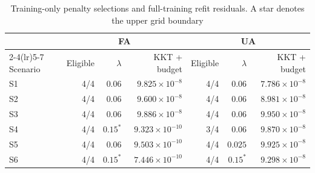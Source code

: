 \begin{table}[htbp]
\centering\small
\caption{Training-only penalty selections and full-training refit residuals. A star denotes the upper grid boundary}
\label{tab:cv-selection}
\setlength{\tabcolsep}{4.5pt}
\begin{tabular}{@{}lrrrrrr@{}}
\toprule
 & \multicolumn{3}{c}{FA} & \multicolumn{3}{c}{UA} \\
\cmidrule(lr){2-4}\cmidrule(lr){5-7}
Scenario & Eligible & $\lambda$ & KKT + budget & Eligible & $\lambda$ & KKT + budget \\
\midrule
S1 & 4/4 & $0.06$ & $9.825\times10^{-8}$ & 4/4 & $0.06$ & $7.786\times10^{-8}$ \\
S2 & 4/4 & $0.06$ & $9.600\times10^{-8}$ & 4/4 & $0.06$ & $8.981\times10^{-8}$ \\
S3 & 4/4 & $0.06$ & $9.886\times10^{-8}$ & 4/4 & $0.06$ & $9.950\times10^{-8}$ \\
S4 & 4/4 & $0.15^{*}$ & $9.323\times10^{-10}$ & 3/4 & $0.06$ & $9.870\times10^{-8}$ \\
S5 & 4/4 & $0.06$ & $9.503\times10^{-10}$ & 4/4 & $0.025$ & $9.925\times10^{-8}$ \\
S6 & 4/4 & $0.15^{*}$ & $7.446\times10^{-10}$ & 4/4 & $0.15^{*}$ & $9.298\times10^{-8}$ \\
\bottomrule
\end{tabular}
\end{table}
